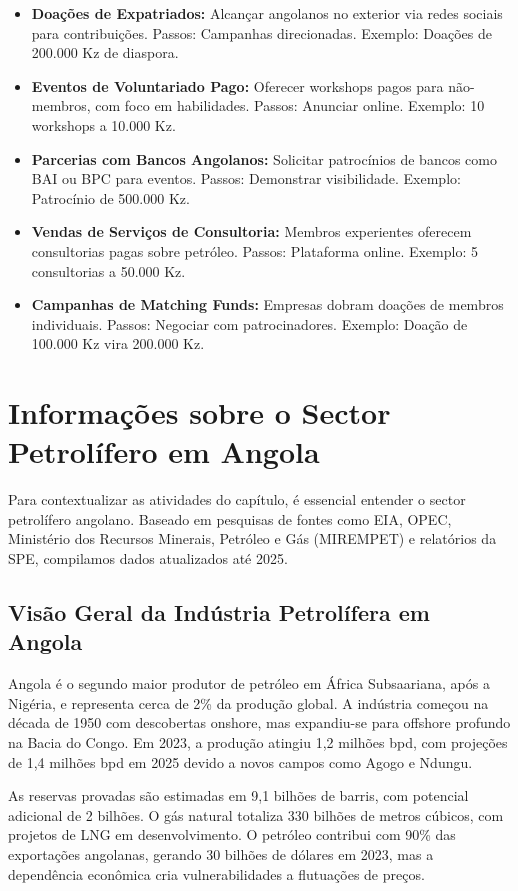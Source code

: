 \documentclass[12pt]{article}
\begin{document}
\begin{itemize}
    \item \textbf{Doações de Expatriados:} Alcançar angolanos no exterior via redes sociais para contribuições. Passos: Campanhas direcionadas. Exemplo: Doações de 200.000 Kz de diaspora.
    \item \textbf{Eventos de Voluntariado Pago:} Oferecer workshops pagos para não-membros, com foco em habilidades. Passos: Anunciar online. Exemplo: 10 workshops a 10.000 Kz.
    \item \textbf{Parcerias com Bancos Angolanos:} Solicitar patrocínios de bancos como BAI ou BPC para eventos. Passos: Demonstrar visibilidade. Exemplo: Patrocínio de 500.000 Kz.
    \item \textbf{Vendas de Serviços de Consultoria:} Membros experientes oferecem consultorias pagas sobre petróleo. Passos: Plataforma online. Exemplo: 5 consultorias a 50.000 Kz.
    \item \textbf{Campanhas de Matching Funds:} Empresas dobram doações de membros individuais. Passos: Negociar com patrocinadores. Exemplo: Doação de 100.000 Kz vira 200.000 Kz.
\end{itemize}

\section{Informações sobre o Sector Petrolífero em Angola}

Para contextualizar as atividades do capítulo, é essencial entender o sector petrolífero angolano. Baseado em pesquisas de fontes como EIA, OPEC, Ministério dos Recursos Minerais, Petróleo e Gás (MIREMPET) e relatórios da SPE, compilamos dados atualizados até 2025.

\subsection{Visão Geral da Indústria Petrolífera em Angola}
Angola é o segundo maior produtor de petróleo em África Subsaariana, após a Nigéria, e representa cerca de 2\% da produção global. A indústria começou na década de 1950 com descobertas onshore, mas expandiu-se para offshore profundo na Bacia do Congo. Em 2023, a produção atingiu 1,2 milhões bpd, com projeções de 1,4 milhões bpd em 2025 devido a novos campos como Agogo e Ndungu.

As reservas provadas são estimadas em 9,1 bilhões de barris, com potencial adicional de 2 bilhões. O gás natural totaliza 330 bilhões de metros cúbicos, com projetos de LNG em desenvolvimento. O petróleo contribui com 90\% das exportações angolanas, gerando 30 bilhões de dólares em 2023, mas a dependência econômica cria vulnerabilidades a flutuações de preços.
\end{document}
